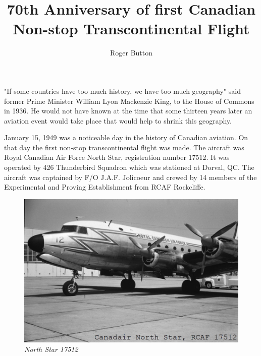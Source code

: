 %


\title{70th Anniversary of first Canadian Non-stop Transcontinental Flight
}
\author{Roger Button}

\maketitle


"If some countries have too much history, we have too much geography" said
former Prime Minister William Lyon Mackenzie King, to the House of Commons in
1936. He would not have known at the time that some thirteen years later an
aviation event would take place that would help to shrink this geography.

January 15, 1949 was a noticeable day in the history of Canadian aviation. On
that day the first non-stop transcontinental flight was made. The aircraft was
Royal Canadian Air Force North Star, registration number 17512. It was operated
by 426 Thunderbird Squadron which was stationed at Dorval, QC. The aircraft was
captained by F/O J.A.F. Jolicoeur and crewed by 14 members of the Experimental
and Proving Establishment from RCAF Rockcliffe.

\begin{figure}[ht!]
   \vspace{2em}
   \centering
   \includegraphics[scale=0.5]{nstar-212-scaled.png}
   \caption*{\small \em North Star 17512}
   \label{fig:nstar-17515}
\end{figure}

